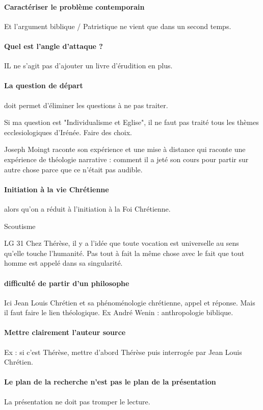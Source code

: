 \paragraph{Caractériser le problème contemporain} Et l'argument biblique / Patristique ne vient que dans un second temps. 


\paragraph{Quel est l'angle d'attaque ? }IL ne s'agit pas d'ajouter un livre d'érudition en plus.

\paragraph{La question de départ} doit permet d'éliminer les questions à ne pas traiter.
\begin{Ex}
    Si ma question est "Individualisme et Eglise", il ne faut pas traité tous les thèmes ecclesiologiques d'Irénée.
    Faire des choix.
\end{Ex}

 

\begin{Ex}
Joseph Moingt   raconte son expérience et une mise à distance qui raconte une expérience de théologie narrative : comment il a jeté son cours pour partir sur autre chose parce que ce n'était pas audible.

    
\end{Ex}

\paragraph{Initiation à la vie Chrétienne} alors qu'on a réduit à l'initiation à la Foi Chrétienne. 
\begin{Ex}
    Scoutisme
\end{Ex}

\begin{Ex}
    LG 31
    Chez Thérèse, il y a l'idée que toute vocation est universelle au sens qu'elle touche l'humanité.
    Pas tout à fait la même chose avec le fait que tout homme est appelé dans sa singularité.
    
\end{Ex}

\paragraph{difficulté de partir d'un philosophe} Ici Jean Louis Chrétien et sa phénoménologie chrétienne, appel et réponse. Mais il faut faire le lien théologique. Ex André Wenin : anthropologie biblique.

\paragraph{Mettre clairement l'auteur source} Ex : si c'est Thérèse, mettre d'abord Thérèse puis interrogée par Jean Louis Chrétien.

\paragraph{Le plan de la recherche n'est pas le plan de la présentation} La présentation ne doit pas tromper le lecture. 